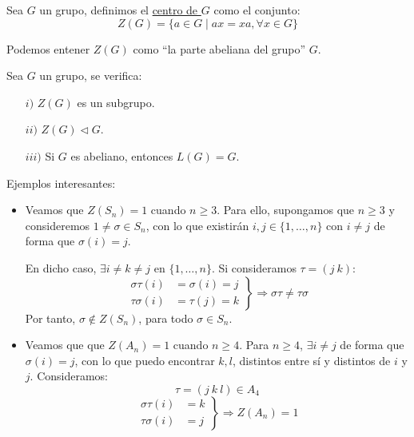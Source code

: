 \begin{definicion}[Centro]
    Sea $G$ un grupo, definimos el \underline{centro de $G$} como el conjunto:
    \begin{equation*}
        Z(G) = \{a\in G \mid ax = xa, \forall x\in G\}
    \end{equation*}
\end{definicion}
Podemos entener $Z(G)$ como ``la parte abeliana del grupo'' $G$.

\begin{prop}
    Sea $G$ un grupo, se verifica:
    \begin{enumerate}
        \item[$i)$] $Z(G)$ es un subgrupo.
        \item[$ii)$] $Z(G)\lhd G$.
        \item[$iii)$] Si $G$ es abeliano, entonces $L(G) = G$.
    \end{enumerate}
\end{prop}

\begin{ejemplo} %
    Ejemplos interesantes:
    \begin{itemize}
        \item Veamos que $Z(S_n) = 1$ cuando $n\geq 3$. Para ello, supongamos que $n\geq 3$ y consideremos $1\neq \sigma\in S_n$, con lo que existirán $i,j\in \{1,\ldots,n\}$ con $i\neq j$ de forma que $\sigma(i) = j$.

            En dicho caso, $\exists i\neq k \neq j$ en $\{1,\ldots,n\}$. Si consideramos $\tau = (j\ k)$:
            \begin{equation*}
                \left.\begin{array}{rl}
                    \sigma\tau(i) &= \sigma(i) = j \\
                    \tau\sigma(i) &= \tau(j) = k
                \end{array}\right\} \Longrightarrow \sigma\tau \neq \tau \sigma
            \end{equation*}
            Por tanto, $\sigma\notin Z(S_n)$, para todo $\sigma\in S_n$.
        \item Veamos que  que $Z(A_n) = 1$ cuando $n\geq 4$. Para $n\geq 4$, $\exists i\neq j$ de forma que $\sigma(i) = j$, con lo que puedo encontrar $k,l$, distintos entre sí y distintos de $i$ y $j$. Consideramos:
            \begin{equation*}
                \tau = (j\ k\ l) \in A_4
            \end{equation*}
            \begin{equation*}
                \left.\begin{array}{rl}
                        \sigma\tau(i) &= k \\
                        \tau\sigma(i) &= j
                \end{array}\right\} \Longrightarrow Z(A_n) = 1
            \end{equation*}
    \end{itemize}
\end{ejemplo}

